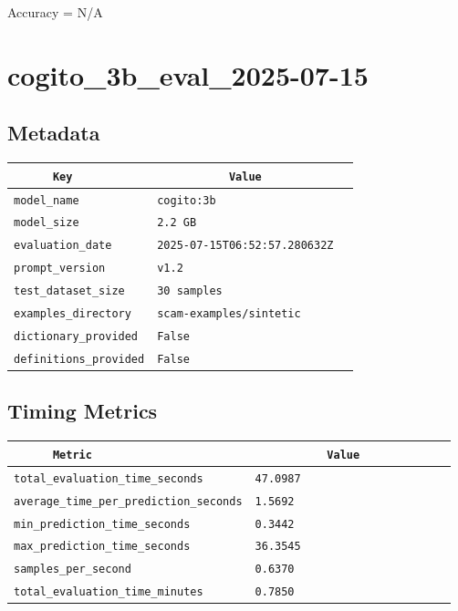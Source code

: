 \documentclass{article}
\begin{document}
\begin{center}
Accuracy = N/A
\end{center}

\section{cogito\_3b\_eval\_2025-07-15}
\subsection{Metadata}

\begin{center}
\begin{tabular}{l | l} \hline
    \verb|      Key      | & \verb|           Value           | \\ \hline
    \hline
    \verb|model_name    | & \verb|cogito:3b                    | \\ \hline
    \verb|model_size    | & \verb|2.2 GB                       | \\ \hline
    \verb|evaluation_date| & \verb|2025-07-15T06:52:57.280632Z  | \\ \hline
    \verb|prompt_version| & \verb|v1.2                         | \\ \hline
    \verb|test_dataset_size| & \verb|30 samples                   | \\ \hline
    \verb|examples_directory| & \verb|scam-examples/sintetic       | \\ \hline
    \verb|dictionary_provided| & \verb|False                        | \\ \hline
    \verb|definitions_provided| & \verb|False                        | \\ \hline
\end{tabular}
\end{center}

\subsection{Timing Metrics}

\begin{center}
\begin{tabular}{l | l} \hline
    \verb|      Metric     | & \verb|           Value           | \\ \hline
    \hline
    \verb|total_evaluation_time_seconds| & \verb|47.0987                      | \\ \hline
    \verb|average_time_per_prediction_seconds| & \verb|1.5692                       | \\ \hline
    \verb|min_prediction_time_seconds| & \verb|0.3442                       | \\ \hline
    \verb|max_prediction_time_seconds| & \verb|36.3545                      | \\ \hline
    \verb|samples_per_second| & \verb|0.6370                       | \\ \hline
    \verb|total_evaluation_time_minutes| & \verb|0.7850                       | \\ \hline
\end{tabular}
\end{center}
\end{document}
